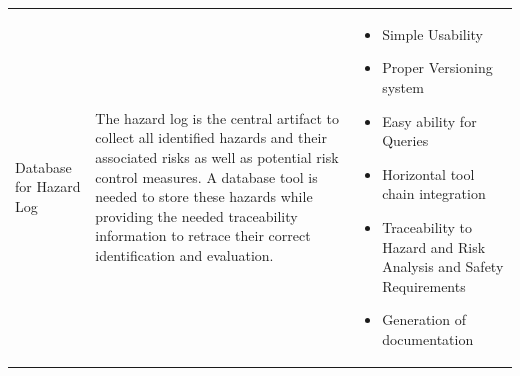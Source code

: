\documentclass{template/openetcs_article}
\begin{document}
\begin{longtable}[htbp]{p{4cm}|p{5cm}|p{5cm}}
     Database for Hazard Log & The hazard log is the central artifact to collect all identified hazards and their associated risks as well as potential risk control measures. A database tool is needed to store these hazards while providing the needed traceability information to retrace their correct identification and evaluation. & \begin{itemize}
                        \item Simple Usability
                        \item Proper Versioning system 
                        \item Easy ability for Queries
                        \item Horizontal tool chain integration
                        \item Traceability to Hazard and Risk Analysis and Safety Requirements
                        \item Generation of documentation
                            \end{itemize} \\
                  

\end{longtable}
\end{document}
